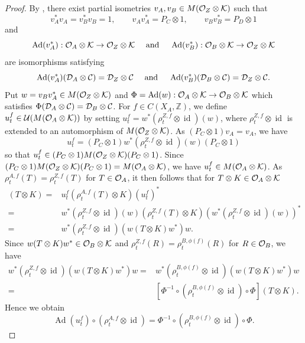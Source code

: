 \documentclass[11pt]{article}
\theoremstyle{plain}
\theoremstyle{definition}
\numberwithin{equation}{section}
\newcommand{\id}{\operatorname{id}}
\newcommand{\Ad}{\operatorname{Ad}}
\newcommand{\Z}{\mathbb{Z}}
\begin{document}
\begin{proof}
By \cite[Proposition 4.1]{MaETDS2004},
there exist
partial isometries
$v_{A}, v_{B} \in M({{\mathcal{O}}_Z}\otimes{\mathcal{K}})$
such that
\begin{equation}
v_{A}^*v_{A} = v_{B}^*v_{B} =1,
\qquad 
v_{A}v_{A}^* = P_C \otimes 1,
\qquad
v_{B}v_{B}^* = P_D \otimes 1
\end{equation}
and
\begin{equation}
\Ad(v_{A}^*):\SOA \rightarrow \SOZ
\quad
\text{ and }
\quad
\Ad(v_{B}^*):\SOB \rightarrow \SOZ
\end{equation}
are isomorphisms satisfying
\begin{equation*}
\Ad(v_{A}^*)(\SDA) = \SDZ
\quad
\text{ and }
\quad
\Ad(v_{B}^*)(\SDB) = \SDZ.
\end{equation*}
Put
$w = v_{B}v_{A}^* \in M({{\mathcal{O}}_Z}\otimes{\mathcal{K}})$
and
$\Phi =\Ad(w): \SOA\rightarrow\SOB$
which satisfies
$\Phi({{\mathcal{D}}_A}\otimes{\mathcal{C}}) = {{\mathcal{D}}_B}\otimes{\mathcal{C}}$.
For
$f\in C(X_A,\Z)$,
we define
$u_t^f \in {{\mathcal{U}}}(M({{\mathcal{O}}_A}\otimes{\mathcal{K}}))$ 
by setting
$u_t^f = w^*(\rho^{Z,f}_t \otimes\id)(w)$,
where 
$\rho^{Z,f}_t \otimes\id$
is extended to an automorphism of $M({{\mathcal{O}}_Z}\otimes{\mathcal{K}})$.
As 
$(P_C \otimes 1) v_{A} = v_A$, 
we have
\begin{equation*}
u_t^f = (P_C \otimes 1) w^*
        (\rho^{Z,f}_t \otimes\id)(w)(P_C \otimes 1) 
\end{equation*}
so that
$u_t^f \in (P_C\otimes 1)M({{\mathcal{O}}_Z}\otimes{\mathcal{K}})(P_C\otimes 1)$.
Since
$(P_C\otimes 1)M({{\mathcal{O}}_Z}\otimes{\mathcal{K}})(P_C\otimes 1) =M({{\mathcal{O}}_A}\otimes{\mathcal{K}})$,
we have
$u_t^f \in M({{\mathcal{O}}_A}\otimes{\mathcal{K}})$.
As $\rho^{A,f}_t(T) =\rho^{Z,f}_t(T)$ for $T \in {{\mathcal{O}}_A}$,
it then follows that
for $T\otimes K\in {{\mathcal{O}}_A}\otimes{\mathcal{K}}$
\begin{align*}
[\Ad(u_t^f) \circ (\rho^{A,f}_t\otimes \id)](T\otimes K)
= & u_t^f(\rho^{A,f}_t(T)\otimes  K) (u_t^f)^* \\
= &  w^*(\rho^{Z,f}_t \otimes\id)(w)(\rho^{Z,f}_t(T)\otimes  K) 
(w^*(\rho^{Z,f}_t \otimes\id)(w))^* \\
= &  w^*(\rho^{Z,f}_t \otimes\id)(w (T\otimes  K)w^*) w. 
\end{align*}
Since
$w (T\otimes  K)w^* \in {{\mathcal{O}}_B}\otimes{\mathcal{K}}$
and $\rho^{Z,f}_t(R) =\rho^{B,\phi(f)}_t(R)$ for $R \in {{\mathcal{O}}_B}$,
we have
\begin{align*}
w^*(\rho^{Z,f}_t \otimes\id)(w (T\otimes  K)w^*) w
= & w^*(\rho^{B,\phi(f)}_t \otimes\id)(w (T\otimes  K)w^*) w \\
= & [\Phi^{-1}\circ (\rho^{B, \phi(f)}_t \otimes\id)
    \circ \Phi](T\otimes K).
\end{align*} 
Hence we obtain
\begin{equation*}
\Ad(u_t^f) \circ (\rho^{A,f}_t\otimes \id)
=  \Phi^{-1}\circ (\rho^{B,\phi(f)}_t \otimes\id)\circ \Phi.
\end{equation*} 
\end{proof}
\end{document}

